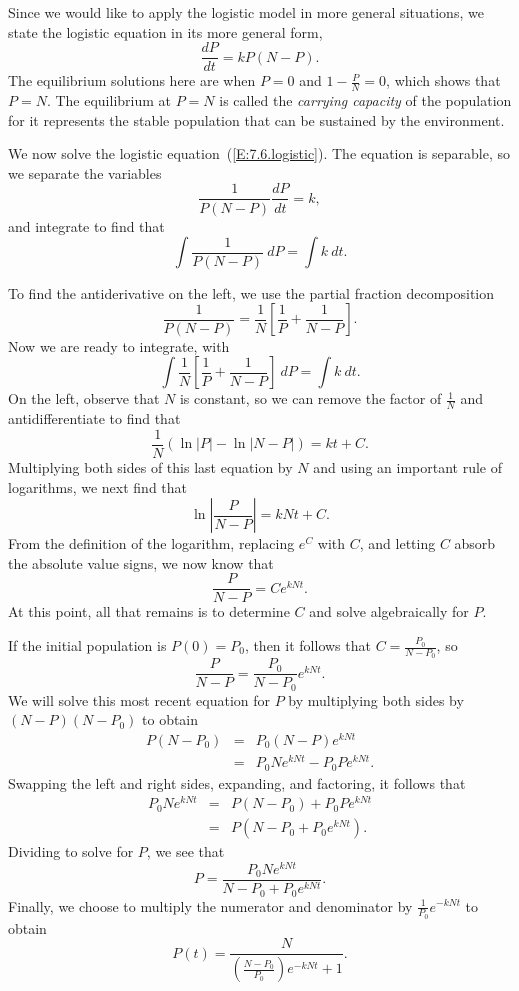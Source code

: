 Since we would like to apply the logistic model in more general situations, we state the logistic equation in its more general form,
\begin{equation} \label{E:7.6.logistic}
\frac{dP}{dt} = kP(N-P).
\end{equation}
The equilibrium solutions here are when $P=0$ and $1-\frac PN = 0$,
which shows that $P=N$.  The equilibrium at $P=N$ is called the {\em
  carrying capacity} of the population for it represents the stable
population that can be sustained by the environment.

We now solve the logistic equation~(\ref{E:7.6.logistic}).  The equation is separable, so we separate the variables
$$
\frac{1}{P(N-P)}\frac{dP}{dt} = k,
$$
and integrate to find that
$$
\int \frac{1}{P(N-P)}~dP = \int k~dt.
$$

To find the antiderivative on the left, we use the partial fraction decomposition
$$
\frac{1}{P(N-P)} = \frac 1N\left[\frac 1P + \frac 1{N-P}\right].
$$
Now we are ready to integrate, with 
$$
\int \frac 1N\left[\frac 1P + \frac 1{N-P}\right] ~dP  =  \int k~dt. 
$$
On the left, observe that $N$ is constant, so we can remove the factor of $\frac{1}{N}$ and antidifferentiate to find that
$$
\frac 1N (\ln|P| - \ln|N-P|)  =  kt + C.
$$
Multiplying both sides of this last equation by $N$ and using an important rule of logarithms, we next find that
$$\ln\left|\frac{P}{N-P}\right| = kNt + C.$$
From the definition of the logarithm, replacing $e^C$ with $C$, and letting $C$ absorb the absolute value signs, we now know that 
$$\frac{P}{N-P} =  Ce^{kNt}.$$
At this point, all that remains is to determine $C$ and solve algebraically for $P$.

If the initial population is $P(0) = P_0$, then it follows that $C = \frac{P_0}{N-P_0}$, so
$$\frac{P}{N-P} = \frac{P_0}{N-P_0}e^{kNt}.$$
We will solve this most recent equation for $P$ by multiplying both sides by
$(N-P)(N-P_0)$ to obtain 
\begin{eqnarray*}
P(N-P_0) &=& P_0(N-P)e^{kNt}  \\
	 &=& P_0Ne^{kNt} - P_0Pe^{kNt}. 
\end{eqnarray*}	 
Swapping the left and right sides, expanding, and factoring, it follows that
\begin{eqnarray*}
P_0Ne^{kNt} & = & P(N-P_0) + P_0 Pe^{kNt}  \\
	& = & P(N-P_0 + P_0e^{kNt}). 
\end{eqnarray*}
Dividing to solve for $P$, we see that
$$P = \frac{P_0Ne^{kNt}}{N-P_0 + P_0e^{kNt}}.$$
Finally, we choose to multiply the numerator and denominator by $\frac{1}{P_0}e^{-kNt}$
to obtain
$$
P(t) = \frac{N}{\left(\frac{N-P_0}{P_0}\right) e^{-kNt} + 1}.
$$

